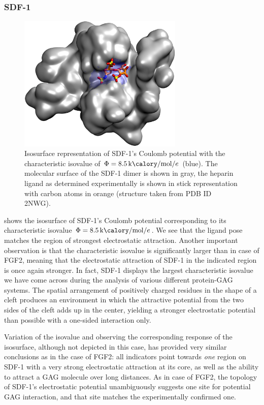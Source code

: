 \subsubsection{SDF-1}

\begin{figure}
\centering
\includegraphics[width=0.7\textwidth]{gfx/bspred/sdf1_isopot_8_5_view1_rotated_jcc_pub_001.jpg}
\caption[]{
Isosurface representation of SDF-1's Coulomb potential with the characteristic
isovalue of $\Phi=\SI{8.5}{\kilo\calory\per\mole\per\elementarycharge}$ (blue).
The molecular surface of the SDF-1 dimer is shown in gray, the heparin ligand as
determined experimentally is shown in stick representation with carbon atoms in
orange (structure taken from PDB ID 2NWG).}
\label{fig:bspred:sdf1_estatic}
\end{figure}

 shows the isosurface of SDF-1's Coulomb potential
corresponding to its characteristic isovalue
$\Phi=\SI{8.5}{\kilo\calory\per\mole\per\elementarycharge}$. We see that the
ligand pose matches the region of strongest electrostatic attraction. Another
important observation is that the characteristic isovalue is significantly
larger than in case of FGF2, meaning that the electrostatic attraction of SDF-1
in the indicated region is once again stronger. In fact, SDF-1 displays the
largest characteristic isovalue we have come across during the analysis of
various different protein-GAG systems. The spatial arrangement of positively
charged residues in the shape of a cleft produces an environment in which the
attractive potential from the two sides of the cleft adds up in the center,
yielding a stronger electrostatic potential than possible with a one-sided
interaction only.

Variation of the isovalue and observing the corresponding response of the
isosurface, although not depicted in this case, has provided very similar
conclusions as in the case of FGF2: all indicators point towards \textit{one}
region on SDF-1 with a very strong electrostatic attraction at its core, as well
as the ability to attract a GAG molecule over long distances. As in case of
FGF2, the topology of SDF-1's electrostatic potential unambiguously suggests one
site for potential GAG interaction, and that site matches the experimentally
confirmed one.







